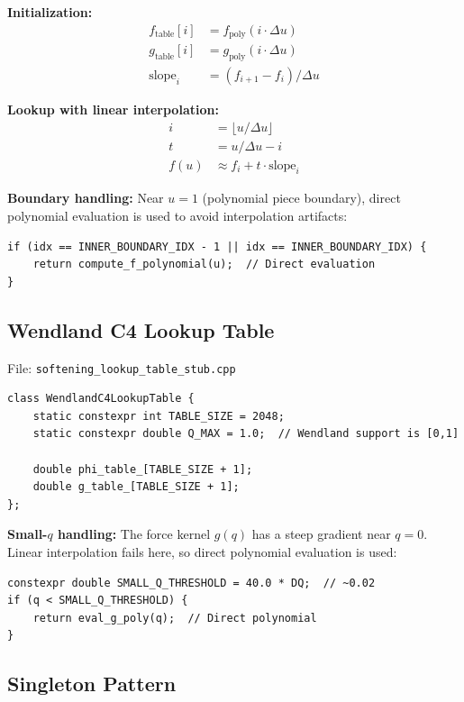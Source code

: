 \documentclass[12pt]{article}
\begin{document}
\textbf{Initialization:}
\begin{align}
f_{\text{table}}[i] &= f_{\text{poly}}(i \cdot \Delta u) \\
g_{\text{table}}[i] &= g_{\text{poly}}(i \cdot \Delta u) \\
\text{slope}_i &= (f_{i+1} - f_i) / \Delta u
\end{align}

\textbf{Lookup with linear interpolation:}
\begin{align}
i &= \lfloor u / \Delta u \rfloor \\
t &= u / \Delta u - i \\
f(u) &\approx f_i + t \cdot \text{slope}_i
\end{align}

\textbf{Boundary handling:} Near $u = 1$ (polynomial piece boundary), direct polynomial
evaluation is used to avoid interpolation artifacts:
\begin{verbatim}
if (idx == INNER_BOUNDARY_IDX - 1 || idx == INNER_BOUNDARY_IDX) {
    return compute_f_polynomial(u);  // Direct evaluation
}
\end{verbatim}

\subsection{Wendland C4 Lookup Table}

File: \texttt{softening\_lookup\_table\_stub.cpp}

\begin{verbatim}
class WendlandC4LookupTable {
    static constexpr int TABLE_SIZE = 2048;
    static constexpr double Q_MAX = 1.0;  // Wendland support is [0,1]

    double phi_table_[TABLE_SIZE + 1];
    double g_table_[TABLE_SIZE + 1];
};
\end{verbatim}

\textbf{Small-$q$ handling:} The force kernel $g(q)$ has a steep gradient near $q = 0$.
Linear interpolation fails here, so direct polynomial evaluation is used:
\begin{verbatim}
constexpr double SMALL_Q_THRESHOLD = 40.0 * DQ;  // ~0.02
if (q < SMALL_Q_THRESHOLD) {
    return eval_g_poly(q);  // Direct polynomial
}
\end{verbatim}

\subsection{Singleton Pattern}
\end{document}
